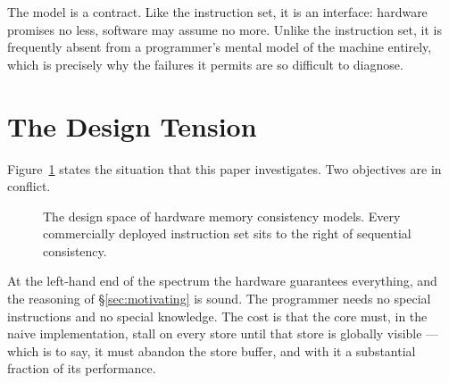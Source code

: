 The model is a contract.
Like the instruction set, it is an interface: hardware
promises no less, software may assume no more.
Unlike the instruction set, it is
frequently absent from a programmer's mental model of the machine entirely, which
is precisely why the failures it permits are so difficult to diagnose.

\section{The Design Tension}
\label{sec:tension}

Figure~\ref{fig:tension} states the situation that this paper investigates.
Two objectives are in conflict.

\begin{figure}[H]
\centering
{}
\caption{The design space of hardware memory consistency models. Every
commercially deployed instruction set sits to the right of sequential
consistency.}
\label{fig:tension}
\end{figure}

At the left-hand end of the spectrum the hardware guarantees everything, and the
reasoning of \S\ref{sec:motivating} is sound.
The programmer needs no special
instructions and no special knowledge.
The cost is that the core must, in the
naive implementation, stall on every store until that store is globally visible
--- which is to say, it must abandon the store buffer, and with it a substantial
fraction of its performance.

